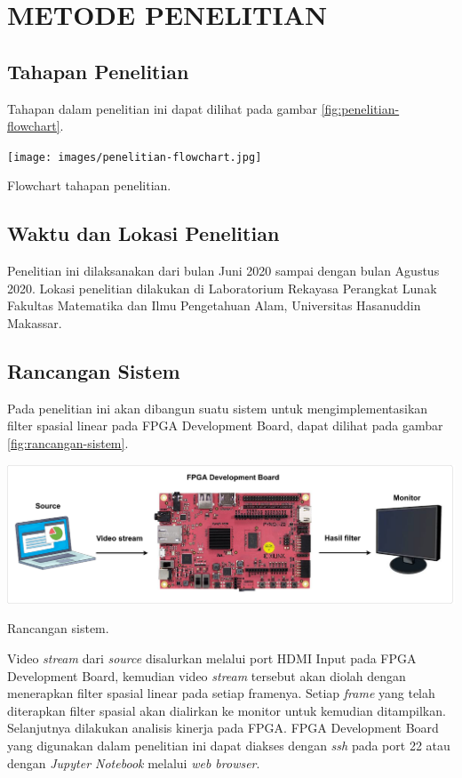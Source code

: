 
\chapter{METODE PENELITIAN}


\section{Tahapan Penelitian}
Tahapan dalam penelitian ini dapat dilihat pada gambar \ref{fig:penelitian-flowchart}.
\begin{afigure}
    \texttt{[image: images/penelitian-flowchart.jpg]}
    \caption{Flowchart tahapan penelitian.}
    \label{fig:penelitian-flowchart}
\end{afigure}


\section{Waktu dan Lokasi Penelitian}
Penelitian ini dilaksanakan dari bulan Juni 2020 sampai dengan bulan Agustus 2020. Lokasi penelitian dilakukan di Laboratorium Rekayasa Perangkat Lunak Fakultas Matematika dan Ilmu Pengetahuan Alam, Universitas Hasanuddin Makassar.

\section{Rancangan Sistem}
Pada penelitian ini akan dibangun suatu sistem untuk mengimplementasikan filter spasial linear pada FPGA Development Board, dapat dilihat pada gambar \ref{fig:rancangan-sistem}.
\begin{afigure}
    \includegraphics[width=1\textwidth, center]{images/rancangan-sistem2.png}
    \caption{Rancangan sistem.}
    \label{fig:rancangan-sistem}
\end{afigure}

Video \textit{stream} dari \textit{source} disalurkan melalui port HDMI Input pada FPGA Development Board, kemudian video \textit{stream} tersebut akan diolah dengan menerapkan filter spasial linear pada setiap framenya. Setiap \textit{frame} yang telah diterapkan filter spasial akan dialirkan ke monitor untuk kemudian ditampilkan. Selanjutnya dilakukan analisis kinerja pada FPGA. FPGA Development Board yang digunakan dalam penelitian ini dapat diakses dengan \textit{ssh} pada port 22 atau dengan \textit{Jupyter Notebook} melalui \textit{web browser}.

